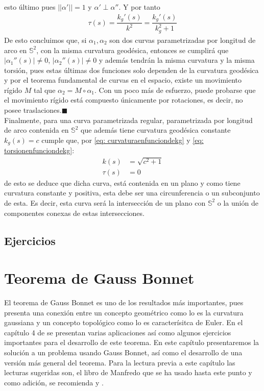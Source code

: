 \documentclass[oneside,11pt]{memoir}
\begin{document}
esto último pues $||\alpha'||=1$ y $\alpha'\perp \alpha''$. Y por tanto
\begin{align}
    \tau(s)=\dfrac{k_g'(s)}{k^2}=\dfrac{k_g'(s)}{k_g^2+1} \label{eq: torsionenfunciondekg}
\end{align}
De esto concluimos que, si $\alpha_1,\alpha_2$ son dos curvas parametrizadas por longitud de arco en $\mathbb{S}^2$, con la misma curvatura geodésica, entonces se cumplirá que $|\alpha_1''(s)|\neq 0$, $|\alpha_2''(s)|\neq 0$ y además tendrán la misma curvatura y la misma torsión, pues estas últimas dos funciones solo dependen de la curvatura geodésica y por el teorema fundamental de curvas en el espacio, existe un movimiento rígido $M$ tal que $\alpha_2 = M\circ \alpha_1$. Con un poco más de esfuerzo, puede probarse que el movimiento rígido está compuesto únicamente por rotaciones, es decir, no posee traslaciones.\hfill $\blacksquare$\\

Finalmente, para una curva parametrizada regular, parametrizada por longitud de arco contenida en $\mathbb{S}^2$ que además tiene curvatura geodésica constante $k_g(s)=c$ cumple que, por \ref{eq: curvaturaenfunciondekg} y \ref{eq: torsionenfunciondekg}:
\begin{align*}
    k(s)&=\sqrt{c^2+1}\\
    \tau(s)&=0
\end{align*}
de esto se deduce que dicha curva, está contenida en un plano y como tiene curvatura constante y positiva, esta debe ser una circunferencia o un subconjunto de esta. Es decir, esta curva será la intersección de un plano con $\mathbb{S}^2$ o la unión de componentes conexas de estas intersecciones. 

\section{Ejercicios}

\chapter{Teorema de Gauss Bonnet}
El teorema de Gauss Bonnet es uno de los resultados más importantes, pues presenta una conexión entre un concepto geométrico como lo es la curvatura gaussiana y un concepto topológico como lo es caracterísitca de Euler. En el capítulo 4 de \cite{do2016differential} se presentan varias aplicaciones así como algunos ejercicios importantes para el desarrollo de este teorema. En este capítulo presentaremos la solución a un problema usando Gauss Bonnet, así como el desarrollo de una versión más general del teorema. Para la lectura previa a este capítulo las lecturas sugeridas son, el libro de Manfredo que se ha usado hasta este punto y como adición, se recomienda \cite{do1998forms} y \cite{do1992riemannian}.
\end{document}
